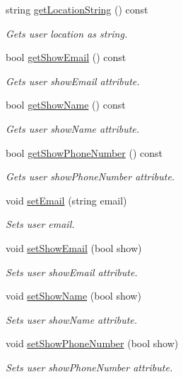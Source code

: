 \begin{DoxyCompactItemize}
string \hyperlink{class_user_a7185d303044e8dbb683b717228e2560d}{get\+Location\+String} () const 
\begin{DoxyCompactList}\small\item\em Gets user location as string. \end{DoxyCompactList}\item 
bool \hyperlink{class_user_a6d936807efcd03cf1763742668ff8b7a}{get\+Show\+Email} () const 
\begin{DoxyCompactList}\small\item\em Gets user show\+Email attribute. \end{DoxyCompactList}\item 
bool \hyperlink{class_user_a232cf36107c8b0f7ff9440fc97cb402f}{get\+Show\+Name} () const 
\begin{DoxyCompactList}\small\item\em Gets user show\+Name attribute. \end{DoxyCompactList}\item 
bool \hyperlink{class_user_a55730e5ee153d90c64b1871d06055c26}{get\+Show\+Phone\+Number} () const 
\begin{DoxyCompactList}\small\item\em Gets user show\+Phone\+Number attribute. \end{DoxyCompactList}\item 
void \hyperlink{class_user_a9d38dd7a9f5ca79cf17ecf572d42c647}{set\+Email} (string email)
\begin{DoxyCompactList}\small\item\em Sets user email. \end{DoxyCompactList}\item 
void \hyperlink{class_user_af2c1c491ccbb27dcf3426b8ab89841d5}{set\+Show\+Email} (bool show)
\begin{DoxyCompactList}\small\item\em Sets user show\+Email attribute. \end{DoxyCompactList}\item 
void \hyperlink{class_user_a655b1a3e4d1877a8cddb9a3d874c2844}{set\+Show\+Name} (bool show)
\begin{DoxyCompactList}\small\item\em Sets user show\+Name attribute. \end{DoxyCompactList}\item 
void \hyperlink{class_user_ae8606e0f992f391088af95a80aeaef07}{set\+Show\+Phone\+Number} (bool show)
\begin{DoxyCompactList}\small\item\em Sets user show\+Phone\+Number attribute. \end{DoxyCompactList}\item 

\end{DoxyCompactItemize}

